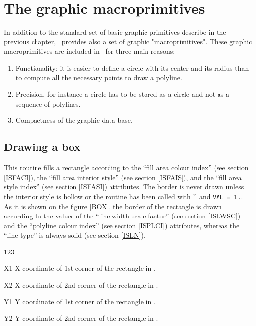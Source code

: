 \chapter{The graphic macroprimitives}

In addition to the standard set of basic graphic primitives describe
in the previous chapter, \HIGZ~provides also a set of graphic "macroprimitives".
These graphic macroprimitives are included in \HIGZ~for three main reasons:
\begin{enumerate}
\item Functionality: it is easier to define a circle with its center and its
      radius than to compute all the necessary points to draw a polyline.
\item Precision, for instance a circle has to be stored as a circle and not as
      a sequence of polylines.
\item Compactness of the graphic data base.
\end{enumerate}
 
\section{Drawing a box}
\Action
This routine fills a rectangle according to the ``fill area colour index''
(see section \ref{ISFACI}), the ``fill area interior style'' (see section
\ref{ISFAIS}), and the ``fill area style index'' (see section \ref{ISFASI})
attributes. The border is never drawn unless the interior
style is hollow or the routine  has been called with ''
and {\tt VAL = 1.}. As it is shown on the figure \ref{BOX}, the border of the
rectangle is drawn according to the values of the ``line width scale factor''
(see section \ref{ISLWSC}) and the ``polyline colour index'' (see section
\ref{ISPLCI}) attributes, whereas the ``line type'' is always solid (see
section \ref{ISLN}).
\Pdesc
\begin{DLtt}{123}
\item[X1] X coordinate of 1st corner of the rectangle in \wc.
\item[X2] X coordinate of 2nd corner of the rectangle in \wc.
\item[Y1] Y coordinate of 1st corner of the rectangle in \wc.
\item[Y2] Y coordinate of 2nd corner of the rectangle in \wc.
\end{DLtt}

